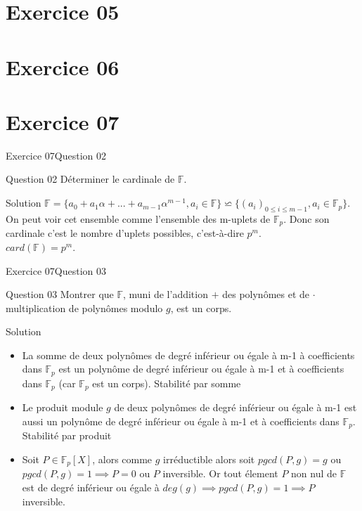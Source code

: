 \documentclass[10pt]{beamer}
\begin{document}
    \section{Exercice 05}
    \section{Exercice 06}
    \section{Exercice 07}


        \begin{frame}{Exercice 07}{Question 02}
            \begin{alertblock}{Question 02}
                Déterminer le cardinale de $\mathbb{F}$.
            \end{alertblock}
            \begin{exampleblock}{Solution}
                $\mathbb{F} = \{ a_0 + a_1\alpha + ... + a_{m-1}\alpha^{m-1}, a_i \in \mathbb{F}\} \backsimeq \{(a_i)_{0\le i \le m-1}, a_i \in \mathbb{F}_p\}$. On peut voir cet ensemble comme l'ensemble des m-uplets de $\mathbb{F}_p$.
                Donc son cardinale c'est le nombre d'uplets possibles, c'est-à-dire $p^m$.\\
                $card(\mathbb{F}) = p^m$.
            \end{exampleblock}
        \end{frame}

        \begin{frame}{Exercice 07}{Question 03}
            \begin{alertblock}{Question 03}
                Montrer que $\mathbb{F}$, muni de l'addition $+$ des polynômes et de $\cdot$ multiplication de polynômes modulo $g$, est un corps.
            \end{alertblock}
            \begin{exampleblock}{Solution}
                \begin{itemize}
                    \item La somme de deux polynômes de degré inférieur ou égale à m-1 à coefficients dans $\mathbb{F}_p$ est un polynôme de degré inférieur ou égale à m-1 et à coefficients dans $\mathbb{F}_p$ (car $\mathbb{F}_p$ est un corps). Stabilité par somme \pause
                    \item Le produit module $g$ de deux polynômes de degré inférieur ou égale à m-1 est aussi un polynôme de degré inférieur ou égale à m-1 et à coefficients dans $\mathbb{F}_p$. Stabilité par produit \pause
                    \item Soit $P  \in \mathbb{F}_p[X]$, alors comme $g$ irréductible alors soit $pgcd(P,g) = g$ ou $pgcd(P,g) = 1 \implies P = 0$ ou $P$ inversible. Or tout élement $P$ non nul de $\mathbb{F}$ est de degré inférieur ou égale à $deg(g) \implies pgcd(P, g) = 1 \implies P$ inversible. 
                \end{itemize} 
            \end{exampleblock}
        \end{frame}
\end{document}

